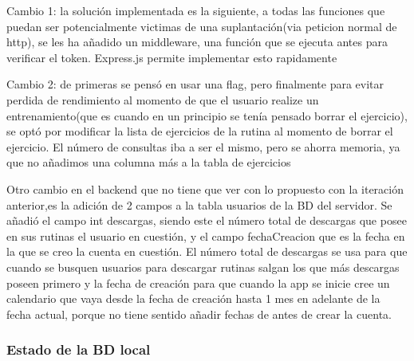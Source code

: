 Cambio 1: la solución implementada es la siguiente, a todas las funciones que puedan ser potencialmente victimas de una suplantación(via peticion normal de http), se les ha añadido un middleware, una función que se ejecuta antes para verificar el token. Express.js permite implementar esto rapidamente

Cambio 2: de primeras se pensó en usar una flag, pero finalmente para evitar perdida de rendimiento al momento de que el usuario realize un entrenamiento(que es cuando en un principio se tenía pensado borrar el ejercicio), se optó por modificar la lista de ejercicios de la rutina al momento de borrar el ejercicio. El número de consultas iba a ser el mismo, pero se ahorra memoria, ya que no añadimos una columna más a la tabla de ejercicios

Otro cambio en el backend que no tiene que ver con lo propuesto con la iteración anterior,es la adición de 2 campos a la tabla usuarios de la BD del servidor. Se añadió el campo int descargas, siendo este el número total de descargas que posee en sus rutinas el usuario en cuestión, y el campo fechaCreacion que es la fecha en la que se creo la cuenta en cuestión. El número total de descargas se usa para que cuando se busquen usuarios para descargar rutinas salgan los que más descargas poseen primero y la fecha de creación para que cuando la app se inicie cree un calendario que vaya desde la fecha de creación hasta 1 mes en adelante de la fecha actual, porque no tiene sentido añadir fechas de antes de crear la cuenta.

\subsubsection{Estado de la BD local}


